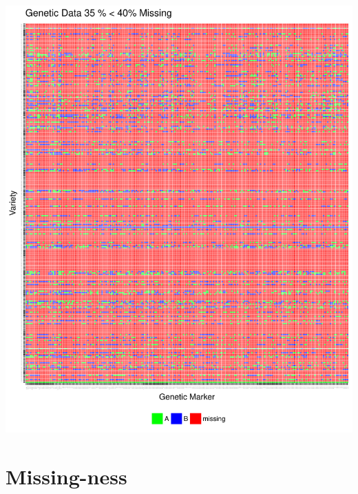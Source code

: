 \documentclass[11pt]{article}\usepackage[]{graphicx}\usepackage[]{color}
\makeatletter
\def\maxwidth{ %
  \ifdim\Gin@nat@width>\linewidth
    \linewidth
  \else
    \Gin@nat@width
  \fi
}
\newenvironment{knitrout}{}{} %
\makeatother
\begin{document}
\begin{knitrout}\footnotesize
{}\color{fgcolor}

{\centering \includegraphics[width=\maxwidth]{figure/missing_plot40-1} 

}



\end{knitrout}







\section{Missing-ness}
\end{document}
